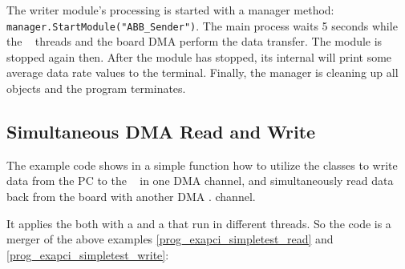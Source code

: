 \begin{compactenum}
\item The writer module's processing 
is started with a manager method: \\
{\tt manager.StartModule("ABB\_Sender")}.
The main process waits 5 seconds while the \dabc~ threads
and the board DMA perform the data transfer. The module is stopped
again then. After the module has stopped, its internal 
will print some average data rate values to the terminal.
Finally, the manager is cleaning up all objects
and the program terminates.


\end{compactenum} 

\subsection{Simultaneous DMA Read and Write}
The example code  shows in a
simple  function how to utilize the
 classes to write data from the PC to the \ABB~ 
in one DMA channel,  and simultaneously read data back from the board with another
DMA . 
channel. 

It applies the  both with
a  and a 
that run in different threads. So the code is a merger of the
above examples \ref{prog_exapci_simpletest_read} and
\ref{prog_exapci_simpletest_write}:

